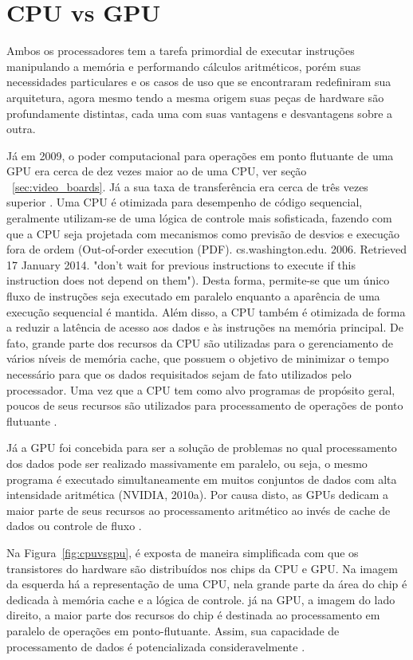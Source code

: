 \section{CPU vs GPU}

  Ambos os processadores tem a tarefa primordial de executar instruções manipulando a memória e performando cálculos aritméticos, porém suas necessidades particulares e os casos de uso que se encontraram redefiniram sua arquitetura, agora mesmo tendo a mesma origem suas peças de hardware são profundamente distintas, cada uma com suas vantagens e desvantagens sobre a outra.

  Já em 2009, o poder computacional para operações em ponto flutuante de uma GPU era cerca de dez vezes maior ao de uma CPU, ver seção ~\ref{sec:video_boards}. Já a sua taxa de transferência era cerca de três vezes superior \citep{massively:16}. Uma CPU é otimizada para desempenho de código sequencial, geralmente utilizam-se de uma lógica de controle mais sofisticada, fazendo com que a CPU seja projetada com mecanismos como previsão de desvios e execução fora de ordem (Out-of-order execution (PDF). cs.washington.edu. 2006. Retrieved 17 January 2014. "don't wait for previous instructions to execute if this instruction does not depend on them"). Desta forma, permite-se que um único fluxo de instruções seja executado em paralelo enquanto a aparência de uma execução sequencial é mantida. Além disso, a CPU também é otimizada de forma a reduzir a latência de acesso aos dados e às instruções na memória principal. De fato, grande parte dos recursos da CPU são utilizadas para o gerenciamento de vários níveis de memória cache, que possuem o objetivo de minimizar o tempo necessário para que os dados requisitados sejam de fato utilizados pelo processador. Uma vez que a CPU tem como alvo programas de propósito geral, poucos de seus recursos são utilizados para processamento de operações de ponto flutuante \citep{massively:16}.

  Já a GPU foi concebida para ser a solução de problemas no qual processamento dos dados pode ser realizado massivamente em paralelo, ou seja, o mesmo programa é executado simultaneamente em muitos conjuntos de dados com alta intensidade aritmética (NVIDIA, 2010a). Por causa disto, as GPUs dedicam a maior parte de seus recursos ao processamento aritmético ao invés de cache de dados ou controle de fluxo \citep{massively:16}.

  Na Figura~\ref{fig:cpuvsgpu}, é exposta de maneira simplificada com que os transistores do hardware são distribuídos nos chips da CPU e GPU. Na imagem da esquerda há a representação de uma CPU, nela grande parte da área do chip é dedicada à memória cache e a lógica de controle. já na GPU, a imagem do lado direito, a maior parte dos recursos do chip é destinada ao processamento em paralelo de operações em ponto-flutuante. Assim, sua capacidade de processamento de dados é potencializada consideravelmente \citep{NTesla:16}.

